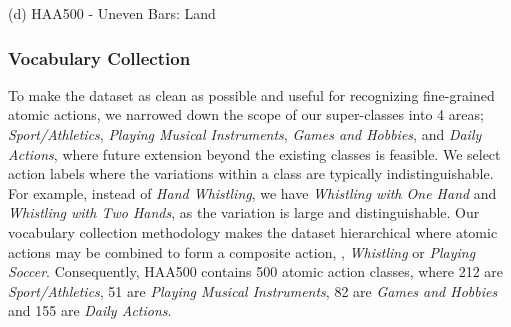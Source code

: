 \documentclass[10pt,twocolumn,letterpaper]{article}
\begin{document}
\begin{figure*}[t]
\begin{center}
\begin{center}
        	(d) HAA500 - Uneven Bars: Land
    	\end{center}
	\endminipage\hfill
\vspace{0.5em}
\caption{Different types of label noise in action recognition datasets. 
\textbf{(a)}: Kinetics 400 has a fixed video length of 10 seconds which cannot accurately annotate quick actions like \textit{Shooting Basketball} where the irrelevant action of dribbling the ball is included in the clip. 
\textbf{(b)}: A camera cut can be seen, showing unrelated frames (audience) after the main action. 
\textbf{(c)}: By not having a frame-accurate clipping, the clip starts with a person-of-interest in the midair, and quickly disappears after few frames, causing the rest of the video clip  not to have any person in action. 
\textbf{(d)}: Our HAA500 accurately annotates the full motion of \textit{Uneven Bars - Land} without any irrelevant frames. All the videos in the class start with the exact frame an athlete puts the hand off the bar, to the exact frame when he/she finishes the landing pose. }
\label{fig:comparison_noise}
\end{center}
\vspace{-2em}
\end{figure*}

\vspace{-1em}
\subsubsection{Vocabulary Collection}
\vspace{-0.5em}
To make the dataset as clean as possible and useful for recognizing fine-grained atomic actions, we narrowed down the scope of our super-classes into 4 areas; \textit{Sport/Athletics}, \textit{Playing Musical Instruments}, \textit{Games and Hobbies}, and \textit{Daily Actions}, where future extension beyond the existing classes is feasible. 
We select action labels where the variations within a class are typically indistinguishable. For example, instead of \textit{Hand Whistling}, we have \textit{Whistling with One Hand} and \textit{Whistling with Two Hands}, as the variation is large and distinguishable. 
Our vocabulary collection methodology makes the dataset hierarchical where atomic actions may be combined to form a composite action, \eg, \textit{Whistling} or \textit{Playing Soccer}. 
Consequently, HAA500 contains 500 atomic action classes, where 212 are \textit{Sport/Athletics}, 51 are \textit{Playing Musical Instruments}, 82 are \textit{Games and Hobbies} and 155 are \textit{Daily Actions}.
\end{document}
